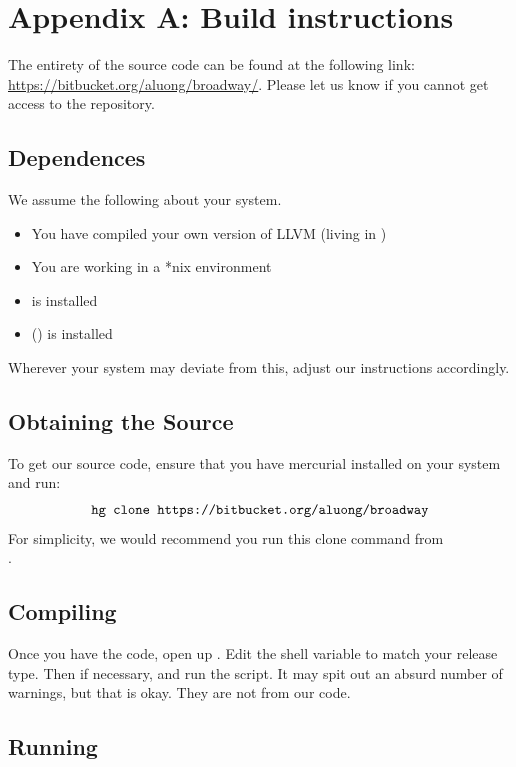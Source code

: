 \section{Appendix A: Build instructions}
The entirety of the source code can be found at the following link:
\url{https://bitbucket.org/aluong/broadway/}. Please let us know if you cannot
get access to the repository.

\subsection{Dependences}
We assume the following about your system.

\begin{itemize}
\item You have compiled your own version of LLVM (living in
  )
\item You are working in a *nix environment
\item {} is installed
\item {} () is installed
\end{itemize}

Wherever your system may deviate from this, adjust our instructions accordingly.

\subsection{Obtaining the Source}

To get our source code, ensure that you have mercurial installed on your system
and run: 
$$\text{\texttt{hg clone https://bitbucket.org/aluong/broadway}}$$
For simplicity, we would recommend you run this clone command from\\
.

\subsection{Compiling}

Once you have the code, open up . Edit the shell variable
 to match your release type. Then  if necessary, and run the script. It may spit out an absurd
number of warnings, but that is okay. They are not from our code.

\subsection{Running}

